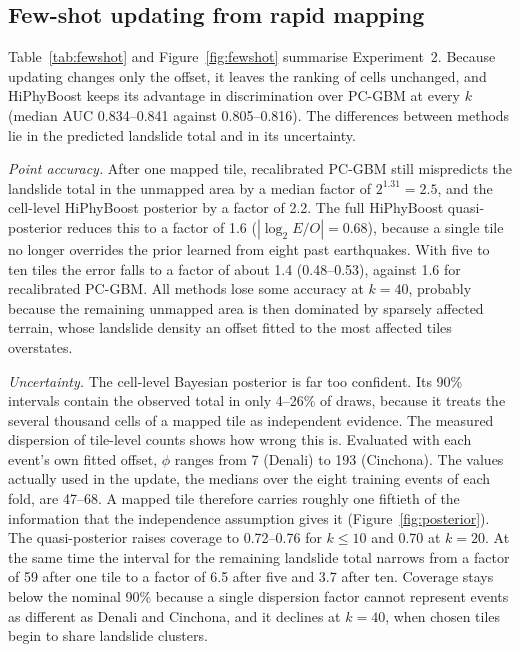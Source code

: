 \subsection{Few-shot updating from rapid mapping}\label{sec:res_fewshot}
Table~\ref{tab:fewshot} and Figure~\ref{fig:fewshot} summarise Experiment~2. Because updating changes only the offset, it leaves the ranking of cells unchanged, and HiPhyBoost keeps its advantage in discrimination over PC-GBM at every $k$ (median AUC 0.834--0.841 against 0.805--0.816). The differences between methods lie in the predicted landslide total and in its uncertainty.

\emph{Point accuracy.} After one mapped tile, recalibrated PC-GBM still mispredicts the landslide total in the unmapped area by a median factor of $2^{1.31}=2.5$, and the cell-level HiPhyBoost posterior by a factor of 2.2. The full HiPhyBoost quasi-posterior reduces this to a factor of 1.6 ($|\log_2 E/O|=0.68$), because a single tile no longer overrides the prior learned from eight past earthquakes. With five to ten tiles the error falls to a factor of about 1.4 (0.48--0.53), against 1.6 for recalibrated PC-GBM. All methods lose some accuracy at $k=40$, probably because the remaining unmapped area is then dominated by sparsely affected terrain, whose landslide density an offset fitted to the most affected tiles overstates.

\emph{Uncertainty.} The cell-level Bayesian posterior is far too confident. Its 90\% intervals contain the observed total in only 4--26\% of draws, because it treats the several thousand cells of a mapped tile as independent evidence. The measured dispersion of tile-level counts shows how wrong this is. Evaluated with each event's own fitted offset, $\phi$ ranges from 7 (Denali) to 193 (Cinchona). The values actually used in the update, the medians over the eight training events of each fold, are 47--68. A mapped tile therefore carries roughly one fiftieth of the information that the independence assumption gives it (Figure~\ref{fig:posterior}). The quasi-posterior raises coverage to 0.72--0.76 for $k\le 10$ and 0.70 at $k=20$. At the same time the interval for the remaining landslide total narrows from a factor of 59 after one tile to a factor of 6.5 after five and 3.7 after ten. Coverage stays below the nominal 90\% because a single dispersion factor cannot represent events as different as Denali and Cinchona, and it declines at $k=40$, when chosen tiles begin to share landslide clusters.


